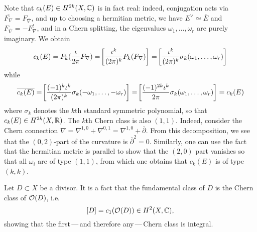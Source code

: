 Note that $c_k(E)\in H^{2k}(X,\mathbb C)$ is in fact real: indeed, conjugation acts via $\overline{F_\nabla}=F_{\overline\nabla}$, and up to choosing a hermitian metric, we have $E^\vee\simeq \overline E$ and $F_{\overline\nabla}=-F_\nabla^t$, and in a Chern splitting, the eigenvalues $\omega_1,\dots,\omega_r$ are purely imaginary. We obtain
\[c_k(E)=P_k(\frac{\iota}{2\pi}F_\nabla)=\!\left[\frac{\iota^k}{(2\pi)^k}P_k(F_\nabla)\right]=\!\left[\frac{\iota^k}{(2\pi)^k}\sigma_k(\omega_1,\dots,\omega_r)\right]
\]
while
\[
\overline{c_k(E)}=\!\left[\frac{(-1)^k\iota ^k}{(2\pi)^k}\sigma_k(-\omega_1,\dots,-\omega_r)\right]=\!\left[\frac{(-1)^{2k}\iota^k}{2\pi}\sigma_k(\omega_1,\dots,\omega_r)\right]=c_k(E)
\]
where $\sigma_k$ denotes the $k$th standard symmetric polynomial, so that $c_k(E)\in H^{2k}(X,\mathbb R)$. The $k$th Chern class is also $(1,1)$. Indeed, consider the Chern connection $\nabla=\nabla^{1,0}+\nabla^{0,1}=\nabla^{1,0}+\overline\partial$. From this decomposition, we see that the $(0,2)$-part of the curvature is $\overline\partial^2=0$. Similarly, one can use the fact that the hermitian metric is parallel to show that the $(2,0)$ part vanishes so that all $\omega_i$ are of type $(1,1)$, from which one obtains that $c_k(E)$ is of type $(k,k)$.

Let $D\subset X$ be a divisor. It is a fact that the fundamental class of $D$ is the Chern class of $\mathcal{O}(D)$, i.e.
\[
[D]=c_1(\mathcal{O}(D))\in H^{2}(X,\mathbb C),
\]
showing that the first\,---\,and therefore any\,---\,Chern class is integral.

